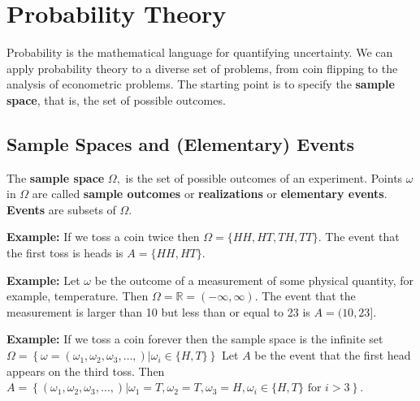 \documentclass[
  14pt,
]{memoir}
\begin{document}
\hypertarget{probability-theory}{%
\section{Probability Theory}\label{probability-theory}}

Probability is the mathematical language for quantifying uncertainty. We can apply probability theory to a diverse set of problems, from coin flipping to the analysis of econometric problems. The starting point is to specify the \textbf{sample space}, that is, the set of possible outcomes.

\hypertarget{sample-spaces-and-elementary-events}{%
\subsection{Sample Spaces and (Elementary) Events}\label{sample-spaces-and-elementary-events}}

The \textbf{sample space} \(\Omega,\) is the set of possible outcomes of an experiment. Points \(\omega\) in \(\Omega\) are called \textbf{sample outcomes} or \textbf{realizations} or \textbf{elementary events}. \textbf{Events} are subsets of \(\Omega\).

\bigskip

\noindent\textbf{Example:} If we toss a coin twice then \(\Omega=\{H H, H T, T H, T T\} .\) The event that the first toss is heads is \(A=\{H H, H T\}\).

\bigskip

\noindent\textbf{Example:} Let \(\omega\) be the outcome of a measurement of some physical quantity, for example, temperature. Then \(\Omega=\mathbb{R}=(-\infty, \infty).\) The event that the measurement is larger than 10 but less than or equal to 23 is \(A=(10,23]\).

\bigskip

\noindent\textbf{Example:} If we toss a coin forever then the sample space is the infinite set \(\Omega=\left\{\omega=\left(\omega_{1}, \omega_{2}, \omega_{3}, \ldots,\right)|\omega_{i} \in\{H, T\}\right\}\) Let \(A\) be the event that the first head appears on the third toss. Then
\(A=\left\{\left(\omega_{1}, \omega_{2}, \omega_{3}, \ldots,\right)| \omega_{1}=T, \omega_{2}=T, \omega_{3}=H, \omega_{i} \in\{H, T\} \text { for } i>3\right\}\).

\bigskip
\end{document}
